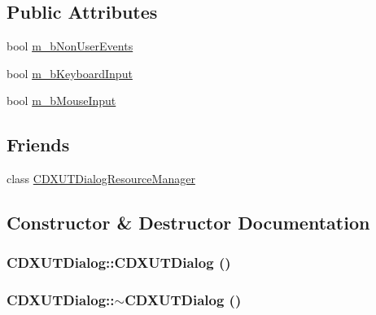 \subsection*{Public Attributes}
\begin{DoxyCompactItemize}
\item 
bool \hyperlink{class_c_d_x_u_t_dialog_a282063050d5cbad2b070ccafe9edb1d4}{m\_\-bNonUserEvents}
\item 
bool \hyperlink{class_c_d_x_u_t_dialog_ab298c311bb2389a8928c0650f8da4df8}{m\_\-bKeyboardInput}
\item 
bool \hyperlink{class_c_d_x_u_t_dialog_a4e6779884aa890d660bf43072ff15b2f}{m\_\-bMouseInput}
\end{DoxyCompactItemize}
\subsection*{Friends}
\begin{DoxyCompactItemize}
\item 
class \hyperlink{class_c_d_x_u_t_dialog_a9f01c7e77f6c0b33ee51859336171041}{CDXUTDialogResourceManager}
\end{DoxyCompactItemize}


\subsection{Constructor \& Destructor Documentation}
\hypertarget{class_c_d_x_u_t_dialog_ad1d01416a8d21047d45c2ac9253933f9}{
\subsubsection[{CDXUTDialog}]{\setlength{\rightskip}{0pt plus 5cm}CDXUTDialog::CDXUTDialog ()}}
\label{class_c_d_x_u_t_dialog_ad1d01416a8d21047d45c2ac9253933f9}
\hypertarget{class_c_d_x_u_t_dialog_ab92a5be82801a2ea84538428ef1edc81}{
\subsubsection[{$\sim$CDXUTDialog}]{\setlength{\rightskip}{0pt plus 5cm}CDXUTDialog::$\sim$CDXUTDialog ()}}
\label{class_c_d_x_u_t_dialog_ab92a5be82801a2ea84538428ef1edc81}


